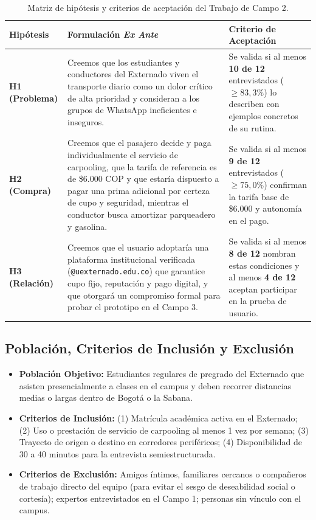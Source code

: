 \documentclass[11pt,a4paper]{article}
\begin{document}
\begin{table}[!htbp]
\centering
\small
\renewcommand{\arraystretch}{1.2}
\begin{tabularx}{\textwidth}{p{2.8cm}Xp{4.2cm}}
\toprule
\textbf{Hip\'otesis} & \textbf{Formulaci\'on \textit{Ex Ante}} & \textbf{Criterio de Aceptaci\'on} \\
\midrule
\textbf{H1 (Problema)} & Creemos que los estudiantes y conductores del Externado viven el transporte diario como un dolor cr\'itico de alta prioridad y consideran a los grupos de WhatsApp ineficientes e inseguros. & Se valida si al menos \textbf{10 de 12} entrevistados ($\ge 83,3\%$) lo describen con ejemplos concretos de su rutina. \\
\midrule
\textbf{H2 (Compra)} & Creemos que el pasajero decide y paga individualmente el servicio de carpooling, que la tarifa de referencia es de \$6.000 COP y que estar\'ia dispuesto a pagar una prima adicional por certeza de cupo y seguridad, mientras el conductor busca amortizar parqueadero y gasolina. & Se valida si al menos \textbf{9 de 12} entrevistados ($\ge 75,0\%$) confirman la tarifa base de \$6.000 y autonom\'ia en el pago. \\
\midrule
\textbf{H3 (Relaci\'on)} & Creemos que el usuario adoptar\'ia una plataforma institucional verificada (\texttt{@uexternado.edu.co}) que garantice cupo fijo, reputaci\'on y pago digital, y que otorgar\'a un compromiso formal para probar el prototipo en el Campo 3. & Se valida si al menos \textbf{8 de 12} nombran estas condiciones y al menos \textbf{4 de 12} aceptan participar en la prueba de usuario. \\
\bottomrule
\end{tabularx}
\caption{Matriz de hip\'otesis y criterios de aceptaci\'on del Trabajo de Campo 2.}
\label{tab:hipotesis}
\end{table}

\subsection{Poblaci\'on, Criterios de Inclusi\'on y Exclusi\'on}
\begin{itemize}[leftmargin=*]
    \item \textbf{Poblaci\'on Objetivo:} Estudiantes regulares de pregrado del Externado que asisten presencialmente a clases en el campus y deben recorrer distancias medias o largas dentro de Bogot\'a o la Sabana.
    \item \textbf{Criterios de Inclusi\'on:} (1) Matr\'icula acad\'emica activa en el Externado; (2) Uso o prestaci\'on de servicio de carpooling al menos 1 vez por semana; (3) Trayecto de origen o destino en corredores perif\'ericos; (4) Disponibilidad de 30 a 40 minutos para la entrevista semiestructurada.
    \item \textbf{Criterios de Exclusi\'on:} Amigos \'intimos, familiares cercanos o compa\~neros de trabajo directo del equipo (para evitar el sesgo de deseabilidad social o cortes\'ia); expertos entrevistados en el Campo 1; personas sin v\'inculo con el campus.
\end{itemize}
\end{document}
